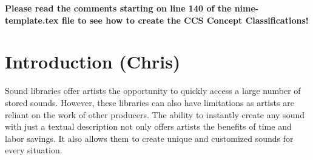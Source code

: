 \documentclass{nime-alternate} %
\begin{document}
%
% 
%


\printccsdesc

\textbf{Please read the comments starting on line 140 of the nime-template.tex file to see how to create the CCS Concept Classifications!} %

\section{Introduction (Chris)}
Sound libraries offer artists the opportunity to quickly access a large number of stored sounds. However, these libraries can also have limitations as artists are reliant on the work of other producers. The ability to instantly create any
sound with just a textual description not only offers artists the benefits of time and labor savings. It also allows them to create unique and customized sounds for every situation.
\end{document}
